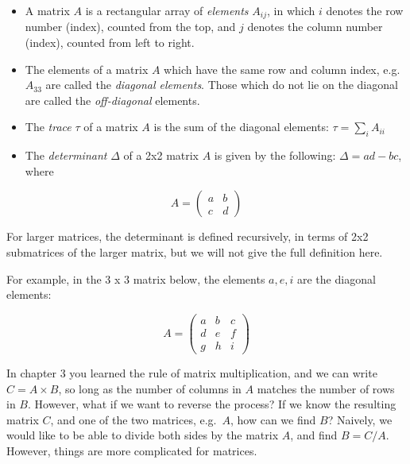 \documentclass[
  letterpaper,
  DIV=11,
  numbers=noendperiod]{scrreprt}
\begin{document}
\begin{tcolorbox}[enhanced jigsaw, colbacktitle=quarto-callout-note-color!10!white, leftrule=.75mm, coltitle=black, left=2mm, breakable, opacityback=0, colback=white, toprule=.15mm, opacitybacktitle=0.6, bottomtitle=1mm, colframe=quarto-callout-note-color-frame, rightrule=.15mm, bottomrule=.15mm, toptitle=1mm, titlerule=0mm, arc=.35mm, title=\textcolor{quarto-callout-note-color}{\faInfo}\hspace{0.5em}{Matrix definitions}]

\begin{itemize}
\item
  A matrix \(A\) is a rectangular array of \emph{elements} \(A_{ij}\),
  in which \(i\) denotes the row number (index), counted from the top,
  and \(j\) denotes the column number (index), counted from left to
  right.
\item
  The elements of a matrix \(A\) which have the same row and column
  index, e.g.~\(A_{33}\) are called the \emph{diagonal elements}. Those
  which do not lie on the diagonal are called the \emph{off-diagonal}
  elements.
\item
  The \emph{trace} \(\tau\) of a matrix \(A\) is the sum of the diagonal
  elements: \(\tau = \sum_i A_{ii}\)
\item
  The \emph{determinant} \(\Delta\) of a 2x2 matrix \(A\) is given by
  the following: \(\Delta = ad - bc\), where
\end{itemize}

\[
A = \left(\begin{array}{cc}a & b \\c & d\end{array}\right)
\]

For larger matrices, the determinant is defined recursively, in terms of
2x2 submatrices of the larger matrix, but we will not give the full
definition here.

\end{tcolorbox}

For example, in the 3 x 3 matrix below, the elements \(a, e, i\) are the
diagonal elements:

\[
A = \left(\begin{array}{ccc}a & b & c \\d & e & f \\g & h & i\end{array}\right)
\]

In chapter 3 you learned the rule of matrix multiplication, and we can
write \(C = A \times B\), so long as the number of columns in \(A\)
matches the number of rows in \(B\). However, what if we want to reverse
the process? If we know the resulting matrix \(C\), and one of the two
matrices, e.g.~\(A\), how can we find \(B\)? Naively, we would like to
be able to divide both sides by the matrix \(A\), and find \(B = C/A\).
However, things are more complicated for matrices.
\end{document}
